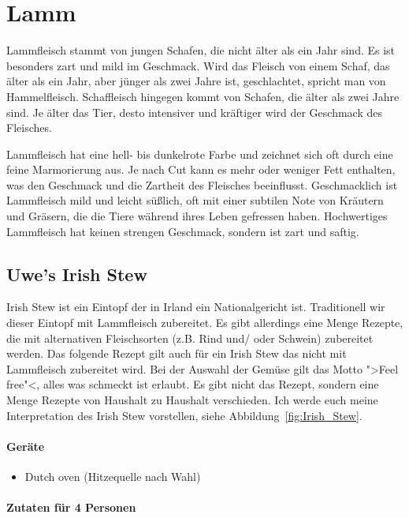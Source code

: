 \section{Lamm}

Lammfleisch stammt von jungen Schafen, die nicht älter als ein Jahr sind. Es ist besonders zart 
und mild im Geschmack. 
Wird das Fleisch von einem Schaf, das älter als ein Jahr, aber jünger als zwei Jahre ist, 
geschlachtet, spricht man von 
Hammelfleisch. Schaffleisch hingegen kommt von Schafen, die älter als zwei Jahre sind. Je älter 
das Tier, desto intensiver
und kräftiger wird der Geschmack des Fleisches.

Lammfleisch hat eine hell- bis dunkelrote Farbe und zeichnet sich oft durch eine feine 
Marmorierung aus. Je nach Cut kann
es mehr oder weniger Fett enthalten, was den Geschmack und die Zartheit des Fleisches 
beeinflusst. Geschmacklich ist
Lammfleisch mild und leicht süßlich, oft mit einer subtilen Note von Kräutern und Gräsern, die 
die Tiere während ihres Leben
gefressen haben. Hochwertiges Lammfleisch hat keinen strengen Geschmack, sondern ist zart 
und saftig.

\subsection{Uwe's Irish Stew}

Irish Stew ist ein Eintopf der in Irland ein Nationalgericht ist. Traditionell wir dieser Eintopf mit 
Lammfleisch zubereitet. Es
gibt allerdings eine Menge Rezepte, die mit alternativen Fleischsorten (z.B. Rind und/ oder 
Schwein) zubereitet werden. Das folgende Rezept
gilt auch für ein Irish Stew das nicht mit Lammfleisch zubereitet wird. Bei der Auswahl der 
Gemüse gilt das Motto ">Feel free"<, alles
was schmeckt ist erlaubt. Es gibt nicht das Rezept, sondern eine Menge Rezepte von Haushalt 
zu Haushalt verschieden. Ich werde euch
meine Interpretation des Irish Stew vorstellen, siehe Abbildung~\vref{fig:Irish_Stew}.

\paragraph{Geräte}

\begin{itemize}[noitemsep]
	\item Dutch oven (Hitzequelle nach Wahl)
\end{itemize}

\paragraph{Zutaten für 4 Personen}

